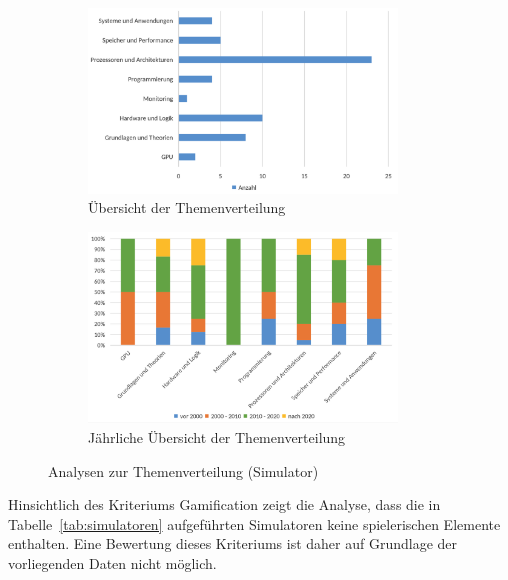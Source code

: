 \begin{figure}[!htbp]
    \centering
    \begin{subfigure}[b]{0.48\textwidth}
        \centering
        \includegraphics[width=0.90\textwidth]{graphics_sim/7-thema.png}
        \caption{Übersicht der Themenverteilung}
        \label{fig:7-thema}
    \end{subfigure}
    \hfill
    \begin{subfigure}[b]{0.48\textwidth}
        \centering
        \includegraphics[width=0.90\textwidth]{graphics_sim/8-thema-jahr.png}
        \caption{Jährliche Übersicht der Themenverteilung}
        \label{fig:8-thema-jahr}
    \end{subfigure}
    \caption{Analysen zur Themenverteilung (Simulator)}
    \label{fig:themen-gesamt}
\end{figure}

Hinsichtlich des Kriteriums Gamification zeigt die Analyse, dass die in Tabelle~\ref{tab:simulatoren} aufgeführten Simulatoren keine spielerischen Elemente enthalten. Eine Bewertung dieses Kriteriums ist daher auf Grundlage der vorliegenden Daten nicht möglich.

